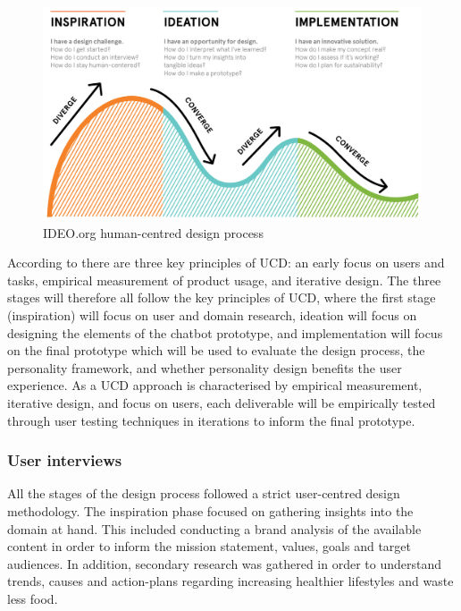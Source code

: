 \begin{figure}[H]
    \centering
    \includegraphics [width=\textwidth] {figures/IDEO.png}
    \caption{IDEO.org human-centred design process}
    \label{fig:ideo}
\end{figure}

According to \cite{Gould1985} there are three key principles of UCD: an early focus on users and tasks, empirical measurement of product usage, and iterative design. The three stages will therefore all follow the key principles of UCD, where the first stage (inspiration) will focus on user and domain research, ideation will focus on designing the elements of the chatbot prototype, and implementation will focus on the final prototype which will be used to evaluate the design process, the personality framework, and whether personality design benefits the user experience. As a UCD approach is characterised by empirical measurement, iterative design, and focus on users, each deliverable will be empirically tested through user testing techniques in iterations to inform the final prototype.

\vspace{2,5mm} %

    \subsubsection{User interviews}
    
   All the stages of the design process followed a strict user-centred design methodology. The inspiration phase focused on gathering insights into the domain at hand. This included conducting a brand analysis of the available content in order to inform the mission statement, values, goals and target audiences. In addition, secondary research was gathered in order to understand trends, causes and action-plans regarding increasing healthier lifestyles and waste less food.
   
